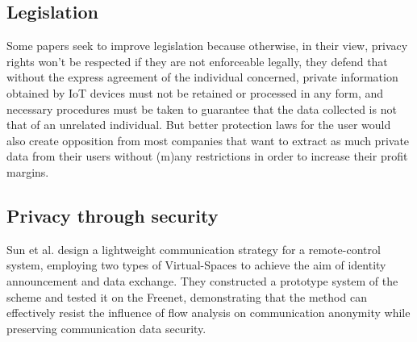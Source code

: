 
\subsection{Legislation}

Some papers seek to improve legislation \cite{WEBER2015618, FabianoInternet}
because otherwise, in their view, privacy rights won't be respected if they
are not enforceable legally, they defend that without the express agreement
of the individual concerned, private information obtained by IoT devices
must not be retained or processed in any form, and necessary procedures
must be taken to guarantee that the data collected is not that of an unrelated
individual. But better protection laws for the user would also create opposition
from most companies that want to extract as much private data from their
users without (m)any restrictions in order to increase their profit margins.

\subsection{Privacy through security}

Sun et al. \cite{SunSecure} design a lightweight communication strategy
for a remote-control system, employing two types of Virtual-Spaces to achieve
the aim of identity announcement and data exchange. They constructed a prototype
system of the scheme and tested it on the Freenet, demonstrating that the
method can effectively resist the influence of flow analysis on communication
anonymity while preserving communication data security.


